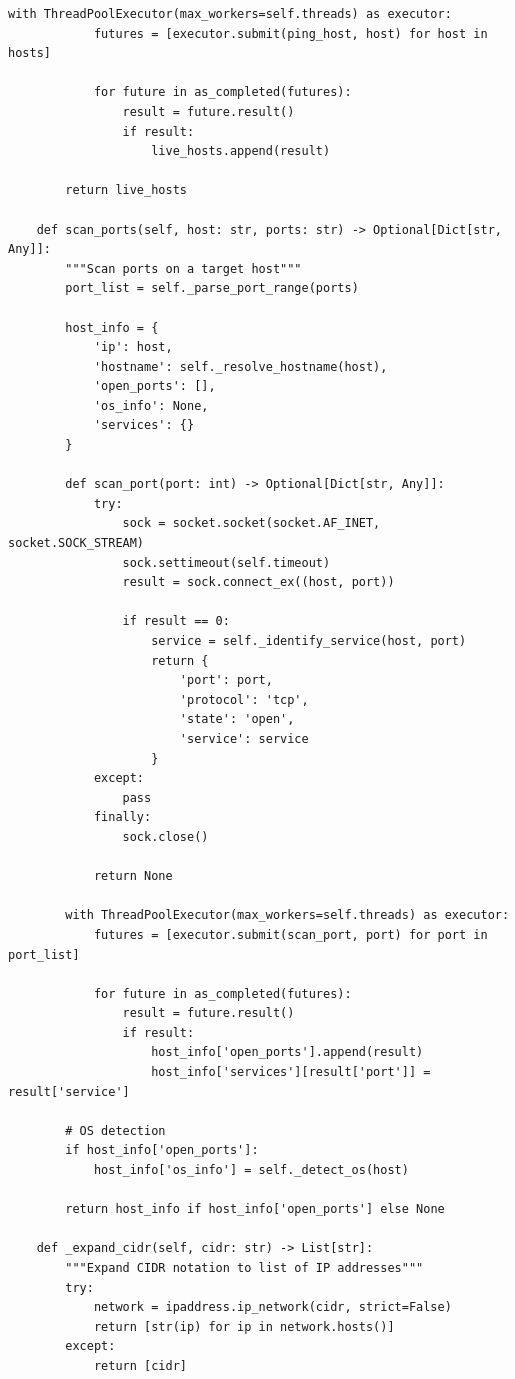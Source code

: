 \documentclass[12pt,a4paper]{report}
\begin{document}
\begin{lstlisting}[caption=Network Scanner Source Code]
        with ThreadPoolExecutor(max_workers=self.threads) as executor:
            futures = [executor.submit(ping_host, host) for host in hosts]
            
            for future in as_completed(futures):
                result = future.result()
                if result:
                    live_hosts.append(result)
        
        return live_hosts
    
    def scan_ports(self, host: str, ports: str) -> Optional[Dict[str, Any]]:
        """Scan ports on a target host"""
        port_list = self._parse_port_range(ports)
        
        host_info = {
            'ip': host,
            'hostname': self._resolve_hostname(host),
            'open_ports': [],
            'os_info': None,
            'services': {}
        }
        
        def scan_port(port: int) -> Optional[Dict[str, Any]]:
            try:
                sock = socket.socket(socket.AF_INET, socket.SOCK_STREAM)
                sock.settimeout(self.timeout)
                result = sock.connect_ex((host, port))
                
                if result == 0:
                    service = self._identify_service(host, port)
                    return {
                        'port': port,
                        'protocol': 'tcp',
                        'state': 'open',
                        'service': service
                    }
            except:
                pass
            finally:
                sock.close()
            
            return None
        
        with ThreadPoolExecutor(max_workers=self.threads) as executor:
            futures = [executor.submit(scan_port, port) for port in port_list]
            
            for future in as_completed(futures):
                result = future.result()
                if result:
                    host_info['open_ports'].append(result)
                    host_info['services'][result['port']] = result['service']
        
        # OS detection
        if host_info['open_ports']:
            host_info['os_info'] = self._detect_os(host)
        
        return host_info if host_info['open_ports'] else None
    
    def _expand_cidr(self, cidr: str) -> List[str]:
        """Expand CIDR notation to list of IP addresses"""
        try:
            network = ipaddress.ip_network(cidr, strict=False)
            return [str(ip) for ip in network.hosts()]
        except:
            return [cidr]
    

\end{lstlisting}
\end{document}
